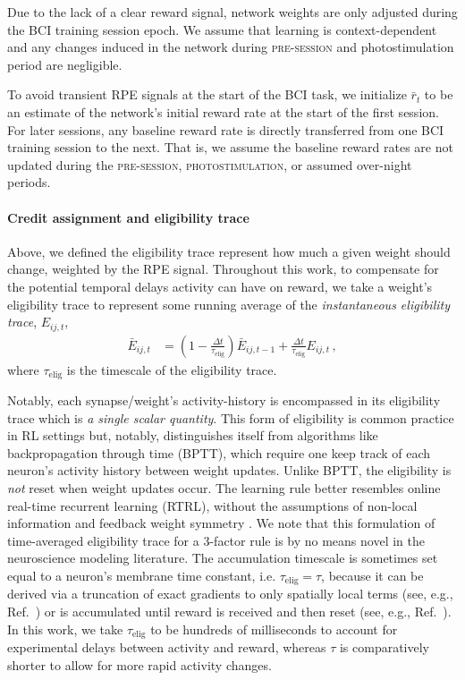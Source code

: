 \documentclass[
  journal=medium,
  manuscript=preprint,
  year=2026
]{aind-preprint}
\begin{document}
Due to the lack of a clear reward signal, network weights are only adjusted during the BCI training session epoch. 
We assume that learning is context-dependent and any changes induced in the network during \textsc{pre-session} and photostimulation period are negligible. 

To avoid transient RPE signals at the start of the BCI task, we initialize $\bar{r}_t$ to be an estimate of the network's initial reward rate at the start of the first session.
For later sessions, any baseline reward rate is directly transferred from one BCI training session to the next.
That is, we assume the baseline reward rates are not updated during the \textsc{pre-session}, \textsc{photostimulation}, or assumed over-night periods.

\paragraph{Credit assignment and eligibility trace}

Above, we defined the eligibility trace represent how much a given weight should change, weighted by the RPE signal.
Throughout this work, to compensate for the potential temporal delays activity can have on reward, we take a weight's eligibility trace to represent some running average of the \emph{instantaneous eligibility trace}, $E_{ij,t}$, 
\begin{align}
    \label{eq:elig_acc}
    \bar{E}_{ij, t} &= \left(1-\frac{\Delta t}{\tau_\text{elig}}\right) \bar{E}_{ij, t-1} + \frac{\Delta t}{\tau_\text{elig}} E_{ij, t}\,, 
\end{align}
where $\tau_\text{elig}$ is the timescale of the eligibility trace.

Notably, each synapse/weight's activity-history is encompassed in its eligibility trace which is \emph{a single scalar quantity}.
This form of eligibility is common practice in RL settings but, notably, distinguishes itself from algorithms like backpropagation through time (BPTT), which require one keep track of each neuron's activity history between weight updates.
Unlike BPTT, the eligibility is \emph{not} reset when weight updates occur.
The learning rule better resembles online real-time recurrent learning (RTRL), without the assumptions of non-local information and feedback weight symmetry \cite{murray2019local}.
We note that this formulation of time-averaged eligibility trace for a 3-factor rule is by no means novel in the neuroscience modeling literature. 
The accumulation timescale is sometimes set equal to a neuron's membrane time constant, i.e. $\tau_\text{elig} = \tau$, because it can be derived via a truncation of exact gradients to only spatially local terms (see, e.g., Ref.~\cite{portes2022distinguishing}) or is accumulated until reward is received and then reset (see, e.g., Ref.~\cite{miconi2017biologically}).
In this work, we take $\tau_\text{elig}$ to be hundreds of milliseconds to account for experimental delays between activity and reward, whereas $\tau$ is comparatively shorter to allow for more rapid activity changes.  
\end{document}
